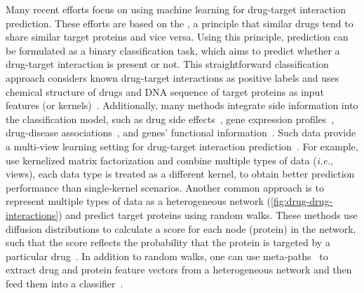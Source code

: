 \documentclass[5p]{elsarticle}
\newcommand{\ie}{\emph{i.e.}\xspace}
\newcommand{\rev}[1]{{\color{black}#1}}
\begin{document}
Many recent efforts focus on using machine learning for drug-target interaction prediction.
These efforts are based on the \rev{{\em guilt-by-association principle}}, a principle that similar drugs tend to share similar target proteins and vice versa.
Using this principle, prediction can be formulated as a binary classification task, which aims to predict whether a drug-target interaction is present or not.
This straightforward classification approach considers known drug-target interactions as positive labels and uses chemical structure of drugs and DNA sequence of \rev{target proteins} as input features (or kernels)~\cite{Bleakley2009supervised,Van2011gaussian,Wang2017networkassisted}.
Additionally, many methods integrate side information into the classification model, such as drug side effects~\cite{Campillos2008,Mizutani2012relating}, gene expression profiles~\cite{Iorio2010discovery}, drug-disease associations~\cite{Wang2014drug}, and genes' functional information~\cite{Yang2014drug}.
Such data provide a multi-view learning setting for drug-target interaction prediction~\cite{Gonen2013kernelized,Zhang2017drug}.
For example, \cite{Gonen2013kernelized} use kernelized matrix factorization and combine multiple types of data (\ie, views), each data type is treated as a different kernel, to obtain better prediction performance than single-kernel scenarios.
Another common approach is to represent multiple types of data as a heterogeneous network (\autoref{fig:drug-drug-interactions}) and predict \rev{target proteins} using random walks.
These methods use diffusion distributions to calculate a score for each node (protein) in the network, such that the score reflects the probability that the protein is targeted by a particular drug~\cite{Wang2014drug,Breinig2015chemical,Lee2017network}.
In addition to random walks, one can use meta-paths~\cite{Sun2011pathsim} to extract drug and protein feature vectors from a heterogeneous network and then \rev{feed} them into a classifier~\cite{Fu2016predicting}.
\end{document}
